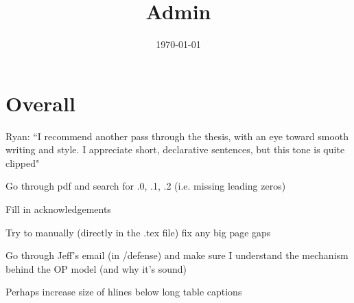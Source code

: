 \documentclass[12pt]{article}
\title{Admin}
\date{\today}
\begin{document}
\maketitle

\section*{Overall}
	\begin{coi}
		\item Ryan: ``I recommend another pass through the thesis, with an eye toward smooth writing and style. I appreciate short, declarative sentences, but this tone is quite clipped"
		\item Go through pdf and search for .0, .1, .2 (i.e. missing leading zeros)
		\item Fill in acknowledgements
		\item Try to manually (directly in the .tex file) fix any big page gaps
		\item Go through Jeff's email (in /defense) and make sure I understand the mechanism behind the OP model (and why it's sound)
		\item Perhaps increase size of hlines below long table captions
	\end{coi}	
\end{document}
